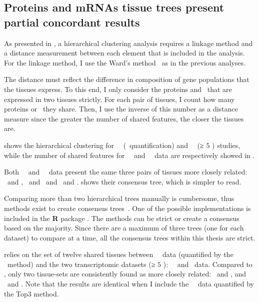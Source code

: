 \subsection{Proteins and mRNAs tissue trees present partial concordant results\\}
\vspace{-12mm}

As presented in ,
a hierarchical clustering analysis requires a linkage method
and a distance measurement between each element that is included in the analysis.
For the linkage method, I use the Ward's method~
as in the previous analyses.

The distance must reflect the difference in composition of gene populations
that the tissues express.
To this end,
I only consider the proteins and \mRNAs\
that are expressed in two tissues strictly.
For each pair of tissues,
I count how many proteins or \mRNAs\ they share.
Then, I use the inverse of this number as a distance measure
since the greater the number of shared features,
the closer the tissues are.

 shows the hierarchical clustering for
\pandey\ \etal\ (\PPKM\ quantification)
and \uhlen\ \etal\ (≥ $5$ \FPKM)  studies,
while the number of shared features for \pandey\ \etal\ and \uhlen\ \etal\ data
are respectively showed in .

Both \pandey\ \etal\ and \uhlen\ \etal\ data present
the same three pairs of tissues more closely related:
\Testis\ and \Ovary, \Rectum\ and \hColon\ and \Liver\ and \Kidney.
\Cref{fig:consensus2D15TQ3} shows their consensus tree,
which is simpler to read.\\
\vspace{-\baselineskip}

Comparing more than two hierarchical trees manually is cumbersome,
thus methods exist to create consensus trees~.
One of the possible implementations is included in
the \textbf{\textsf{R}} package .
The methods can be strict or create a consensus based on the majority.
Since there are a maximum of three trees (one for each dataset)
to compare at a time,
all the consensus trees within this thesis are strict.

 relies on the set of twelve shared tissues between
\pandey\ \etal\ data (quantified by the \PPKM\ method)
and the two transcriptomic datasets (≥ $5$ \FPKM): \uhlen\ \etal\ and \gtex\ data.
Compared to \Cref{fig:consensus2D15TQ3},
only two tissue-sets are consistently found
as more closely related: \Testis\ and \Ovary, and \Liver\ and \Kidney.
Note that the results are identical
when I include the \pandey\ \etal\ data quantified by the Top3 method.


